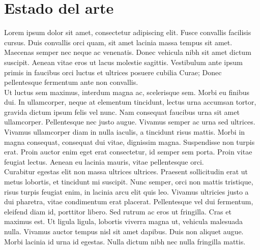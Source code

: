



\chapter{Estado del arte}




Lorem ipsum dolor sit amet, consectetur adipiscing elit. Fusce convallis facilisis cursus. Duis convallis orci quam, sit amet lacinia massa tempus sit amet. Maecenas semper nec neque ac venenatis. Donec vehicula nibh sit amet dictum suscipit. Aenean vitae eros ut lacus molestie sagittis. Vestibulum ante ipsum primis in faucibus orci luctus et ultrices posuere cubilia Curae; Donec pellentesque fermentum ante non convallis.
\\

Ut luctus sem maximus, interdum magna ac, scelerisque sem. Morbi eu finibus dui. In ullamcorper, neque at elementum tincidunt, lectus urna accumsan tortor, gravida dictum ipsum felis vel nunc. Nam consequat faucibus urna sit amet ullamcorper. Pellentesque nec justo augue. Vivamus semper ac urna sed ultrices. Vivamus ullamcorper diam in nulla iaculis, a tincidunt risus mattis. Morbi in magna consequat, consequat dui vitae, dignissim magna. Suspendisse non turpis erat. Proin auctor enim eget erat consectetur, id semper sem porta. Proin vitae feugiat lectus. Aenean eu lacinia mauris, vitae pellentesque orci.
\\

Curabitur egestas elit non massa ultrices ultrices. Praesent sollicitudin erat ut metus lobortis, et tincidunt mi suscipit. Nunc semper, orci non mattis tristique, risus turpis feugiat enim, in lacinia arcu elit quis leo. Vivamus ultricies justo a dui pharetra, vitae condimentum erat placerat. Pellentesque vel dui fermentum, eleifend diam id, porttitor libero. Sed rutrum ac eros ut fringilla. Cras et maximus est. Ut ligula ligula, lobortis viverra magna ut, vehicula malesuada nulla. Vivamus auctor tempus nisl sit amet dapibus. Duis non aliquet augue. Morbi lacinia id urna id egestas. Nulla dictum nibh nec nulla fringilla mattis.
\\

